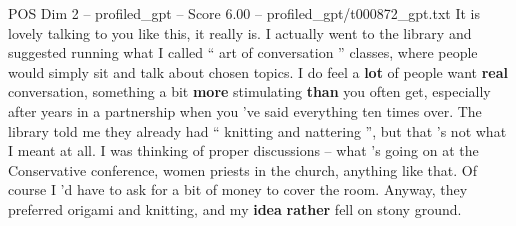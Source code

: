 \begin{textsample}{POS Dim 2 – profiled\_gpt – Score 6.00 – profiled\_gpt/t000872\_gpt.txt}  \label{ex:f2_pos_012}
It is lovely talking to you like this, it really is.
I actually went to the library and suggested running what I called “ art of conversation ” classes, where people would simply sit and talk about chosen topics.
I do feel a \textbf{lot} of people want \textbf{real} conversation, something a bit \textbf{more} stimulating \textbf{than} you often get, especially after years in a partnership when you ’ve said everything ten times over.
The library told me they already had “ knitting and nattering ”, but that ’s not what I meant at all.
I was thinking of proper discussions – what ’s going on at the Conservative conference, women priests in the church, anything like that.
Of course I ’d have to ask for a bit of money to cover the room.
Anyway, they preferred origami and knitting, and my \textbf{idea} \textbf{rather} fell on stony ground.

\end{textsample}
